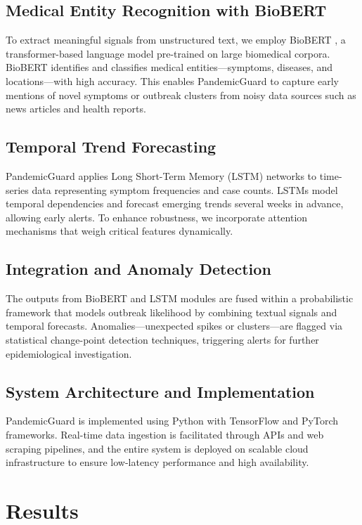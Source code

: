 \documentclass[11pt]{article}
\newcommand{\modelname}{PandemicGuard\xspace}
\begin{document}
\subsection{Medical Entity Recognition with BioBERT}

To extract meaningful signals from unstructured text, we employ BioBERT \cite{lee2020biobert}, a transformer-based language model pre-trained on large biomedical corpora. BioBERT identifies and classifies medical entities—symptoms, diseases, and locations—with high accuracy. This enables \modelname to capture early mentions of novel symptoms or outbreak clusters from noisy data sources such as news articles and health reports.

\subsection{Temporal Trend Forecasting}

\modelname applies Long Short-Term Memory (LSTM) networks to time-series data representing symptom frequencies and case counts. LSTMs model temporal dependencies and forecast emerging trends several weeks in advance, allowing early alerts. To enhance robustness, we incorporate attention mechanisms that weigh critical features dynamically.

\subsection{Integration and Anomaly Detection}

The outputs from BioBERT and LSTM modules are fused within a probabilistic framework that models outbreak likelihood by combining textual signals and temporal forecasts. Anomalies—unexpected spikes or clusters—are flagged via statistical change-point detection techniques, triggering alerts for further epidemiological investigation.

\subsection{System Architecture and Implementation}

\modelname is implemented using Python with TensorFlow and PyTorch frameworks. Real-time data ingestion is facilitated through APIs and web scraping pipelines, and the entire system is deployed on scalable cloud infrastructure to ensure low-latency performance and high availability.

\section{Results}
\end{document}
